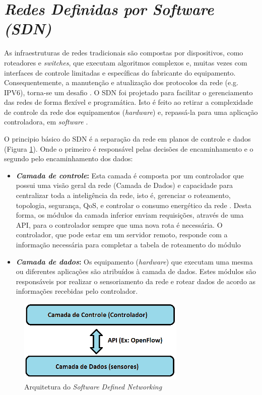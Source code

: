 \section{\textit{Redes Definidas por Software (SDN)}}
\label{s_c2_sdn}

As infraestruturas de redes tradicionais são compostas por dispositivos, como roteadores e \textit{switches}, que executam algoritmos complexos e, muitas vezes com interfaces de controle limitadas e específicas do fabricante do equipamento. Consequentemente, a manutenção e atualização dos protocolos da rede (e.g. IPV6), torna-se um desafio \cite{nunes2014survey}. O \ac{SDN} foi projetado para facilitar o gerenciamento das redes de forma flexível e programática. Isto é feito ao retirar a complexidade de controle da rede dos equipamentos (\textit{hardware}) e, repassá-la para uma aplicação controladora, em \textit{software} \cite{Klauberg2016}. 

O principio básico do \ac{SDN} é a separação da rede em planos de controle e dados (Figura \ref{SDN_Arch}). Onde o primeiro é responsável pelas decisões de encaminhamento e o segundo pelo encaminhamento dos dados:

\begin{itemize}
  \item \textbf{\textit{Camada de controle}:} Esta camada é composta por um controlador que possui uma visão geral da rede (Camada de Dados) e capacidade para centralizar toda a inteligência da rede, isto é, gerenciar o roteamento, topologia, segurança, \ac{QoS}, e controlar o consumo energético da rede \cite{Ndiaye}. Desta forma, os módulos da camada inferior enviam requisições, através de uma \ac{API}, para o controlador sempre que uma nova rota é necessária. O controlador, que pode estar em um servidor remoto, responde com a informação necessária para completar a tabela de roteamento do módulo
  \item \textbf{\textit{Camada de dados}:} Os equipamento (\textit{hardware}) que executam uma mesma ou diferentes aplicações são atribuídos à camada de dados. Estes módulos são responsáveis por realizar o sensoriamento da rede e rotear dados de acordo as informações recebidas pelo controlador.
\end{itemize}


\begin{figure}[h!]
    \centering
    \includegraphics[width=8cm]{figs/sdnArch.png}
    \caption{Arquitetura do \textit{Software Defined Networking}}
    \label{SDN_Arch}
\end{figure}


